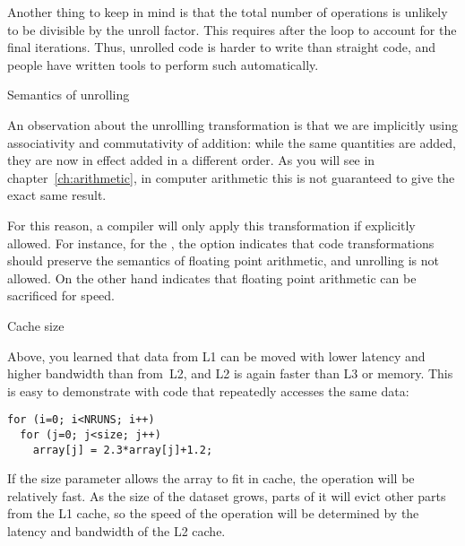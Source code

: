 Another thing to keep in mind is that the total number of operations
is unlikely to be divisible by the unroll factor. This requires
 after the loop to account for the final
iterations. Thus, unrolled code is harder to write than straight code,
and people have written tools to perform such
 automatically.

 {Semantics of unrolling}

An observation about the unrollling transformation
is that we are implicitly using
associativity and commutativity of addition: while the same quantities
are added, they are now in effect added in a different order. As you
will see in chapter~\ref{ch:arithmetic}, in computer arithmetic
this is not guaranteed to
give the exact same result. 

For this reason, a compiler will only apply this transformation
if explicitly allowed. For instance, for the ,
the option  indicates
that code transformations should preserve the semantics of
floating point arithmetic, and unrolling is not allowed.
On the other hand  indicates
that floating point arithmetic can be sacrificed for speed.



\begin{comment}
  Cycle times for unrolling the inner product operation up to six times
  are given in table~\ref{tab:unroll-inner}. Note that the timings do
  not show a monotone behavior at the unrolling by four. This sort of
  variation is due to various memory-related factors.

  \begin{table}[ht]
    \leavevmode\kern\unitindent
    \begin{tabular}{rrrrrr}
      \toprule
      1&2&3&4&5&6\\ \midrule 6794&507&340&359&334&528\\ \bottomrule
    \end{tabular}
    \caption{Cycle times for the inner product operation, unrolled up to
      six times.}
    \label{tab:unroll-inner}
  \end{table}
\end{comment}


 {Cache size}
\label{sec:coding-cachesize}

Above, you learned that data from L1 can be moved with lower latency
and higher bandwidth than from~L2, and L2 is again faster than L3 or
memory.
This is easy to demonstrate with code that repeatedly accesses
the same data:
\begin{verbatim}
for (i=0; i<NRUNS; i++)
  for (j=0; j<size; j++)
    array[j] = 2.3*array[j]+1.2;
\end{verbatim}
If the size parameter allows the array to fit in cache, the operation
will be relatively fast. As the size of the dataset grows, parts of it
will evict other parts from the L1 cache, so the speed of the
operation will be determined by the latency and bandwidth of the L2
cache.

